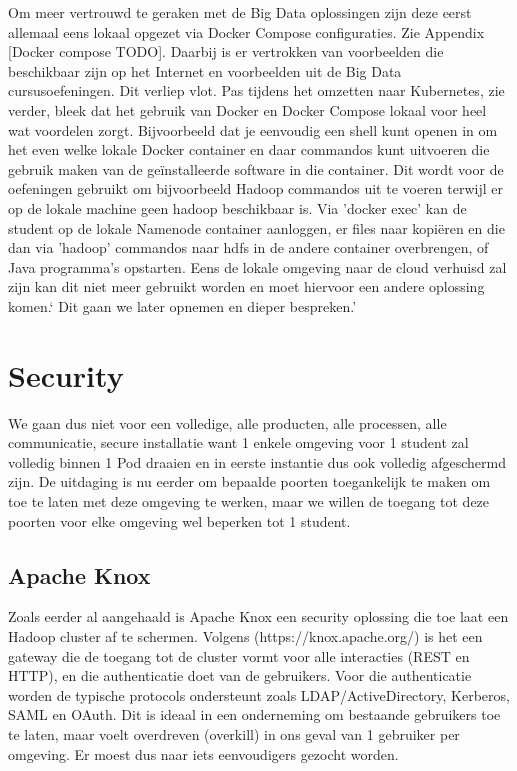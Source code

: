 Om meer vertrouwd te geraken met de Big Data oplossingen zijn deze eerst allemaal eens lokaal opgezet via Docker Compose configuraties. Zie Appendix [Docker compose TODO].
Daarbij is er vertrokken van voorbeelden die beschikbaar zijn op het Internet en voorbeelden uit de Big Data cursusoefeningen.
\newline
\newline
Dit verliep vlot. Pas tijdens het omzetten naar Kubernetes, zie verder, bleek dat het gebruik van Docker en Docker Compose lokaal voor heel wat voordelen zorgt. Bijvoorbeeld dat je eenvoudig een shell kunt openen in om het even welke lokale Docker container en daar commandos kunt uitvoeren die gebruik maken van de geïnstalleerde software in die container. Dit wordt voor de oefeningen gebruikt om bijvoorbeeld Hadoop commandos uit te voeren terwijl er op de lokale machine geen hadoop beschikbaar is. Via 'docker exec' kan de student op de lokale Namenode container aanloggen, er files naar kopiëren en die dan via 'hadoop' commandos naar hdfs in de andere container overbrengen, of Java programma's opstarten.
Eens de lokale omgeving naar de cloud verhuisd zal zijn kan dit niet meer gebruikt worden en moet hiervoor een andere oplossing komen.` Dit gaan we later opnemen en dieper bespreken.'

\section{Security}
We gaan dus niet voor een volledige, alle producten, alle processen, alle communicatie, secure installatie want 1 enkele omgeving voor 1 student zal volledig binnen 1 Pod draaien en in eerste instantie dus ook volledig afgeschermd zijn.
De uitdaging is nu eerder om bepaalde poorten toegankelijk te maken om toe te laten met deze omgeving te werken, maar we willen de toegang tot deze poorten voor elke omgeving wel beperken tot 1 student.

\subsection{Apache Knox}
Zoals eerder al aangehaald is Apache Knox een security oplossing die toe laat een Hadoop cluster af te schermen.
Volgens (https://knox.apache.org/) is het een gateway die de toegang tot de cluster vormt voor alle interacties (REST en HTTP), en die authenticatie doet van de gebruikers. Voor die authenticatie worden de typische protocols ondersteunt zoals LDAP/ActiveDirectory, Kerberos, SAML en OAuth. Dit is ideaal in een onderneming om bestaande gebruikers toe te laten, maar voelt overdreven (overkill) in ons geval van 1 gebruiker per omgeving. Er moest dus naar iets eenvoudigers gezocht worden.

